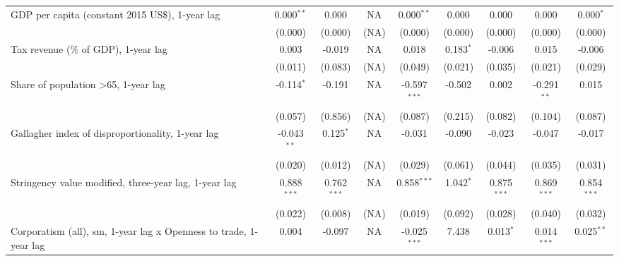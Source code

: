 \begin{table}[htbp]
\begin{tabular}{lcccccccc}
      GDP per capita (constant 2015 US\$), 1-year lag                   & 0.000$^{**}$  & 0.000                     & NA           & 0.000$^{**}$   & 0.000            & 0.000           & 0.000           & 0.000$^{*}$\\   
                                                                        & (0.000)       & (0.000)                   & (NA)         & (0.000)        & (0.000)          & (0.000)         & (0.000)         & (0.000)\\   
      Tax revenue (\% of GDP), 1-year lag                               & 0.003         & -0.019                    & NA           & 0.018          & 0.183$^{*}$      & -0.006          & 0.015           & -0.006\\   
                                                                        & (0.011)       & (0.083)                   & (NA)         & (0.049)        & (0.021)          & (0.035)         & (0.021)         & (0.029)\\   
      Share of population >65, 1-year lag                               & -0.114$^{*}$  & -0.191                    & NA           & -0.597$^{***}$ & -0.502           & 0.002           & -0.291$^{**}$   & 0.015\\   
                                                                        & (0.057)       & (0.856)                   & (NA)         & (0.087)        & (0.215)          & (0.082)         & (0.104)         & (0.087)\\   
      Gallagher index of disproportionality, 1-year lag                 & -0.043$^{**}$ & 0.125$^{*}$               & NA           & -0.031         & -0.090           & -0.023          & -0.047          & -0.017\\   
                                                                        & (0.020)       & (0.012)                   & (NA)         & (0.029)        & (0.061)          & (0.044)         & (0.035)         & (0.031)\\   
      Stringency value modified, three-year lag, 1-year lag             & 0.888$^{***}$ & 0.762$^{***}$             & NA           & 0.858$^{***}$  & 1.042$^{*}$      & 0.875$^{***}$   & 0.869$^{***}$   & 0.854$^{***}$\\   
                                                                        & (0.022)       & (0.008)                   & (NA)         & (0.019)        & (0.092)          & (0.028)         & (0.040)         & (0.032)\\   
      Corporatism (all), sm, 1-year lag x Openness to trade, 1-year lag & 0.004         & -0.097                    & NA           & -0.025$^{***}$ & 7.438            & 0.013$^{*}$     & 0.014$^{***}$   & 0.025$^{**}$\\   

\end{tabular}
\end{table}
